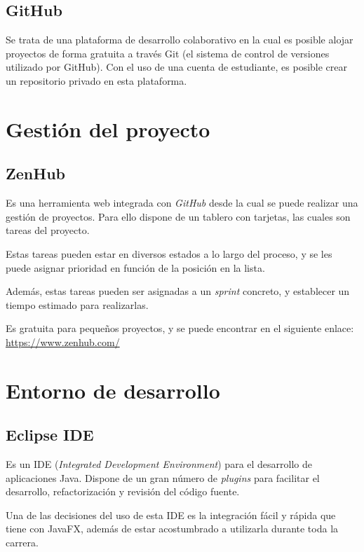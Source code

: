 \subsection{GitHub}\label{github}

Se trata de una plataforma de desarrollo colaborativo en la cual es posible alojar proyectos de forma gratuita a través Git (el sistema de control de versiones utilizado por GitHub). Con el uso de una cuenta de estudiante, es posible crear un repositorio privado en esta plataforma.

\section{Gestión del proyecto}\label{gestion_del_proyecto}

\subsection{ZenHub}\label{zenhub}

Es una herramienta web integrada con \emph{GitHub} desde la cual se puede realizar una gestión de proyectos. Para ello dispone de un tablero con tarjetas, las cuales son tareas del proyecto.

Estas tareas pueden estar en diversos estados a lo largo del proceso, y se les puede asignar prioridad en función de la posición en la lista.

Además, estas tareas pueden ser asignadas a un \emph{sprint} concreto, y establecer un tiempo estimado para realizarlas.

Es gratuita para pequeños proyectos, y se puede encontrar en el siguiente enlace: \url{https://www.zenhub.com/}

\section{Entorno de desarrollo}\label{entorno_de_desarrollo}

\subsection{Eclipse IDE}\label{eclipse_ide}

Es un IDE (\emph{Integrated Development Environment}) para el desarrollo de aplicaciones Java. Dispone de un gran número de \emph{plugins} para facilitar el desarrollo, refactorización y revisión del código fuente.

Una de las decisiones del uso de esta IDE es la integración fácil y rápida que tiene con JavaFX, además de estar acostumbrado a utilizarla durante toda la carrera.

